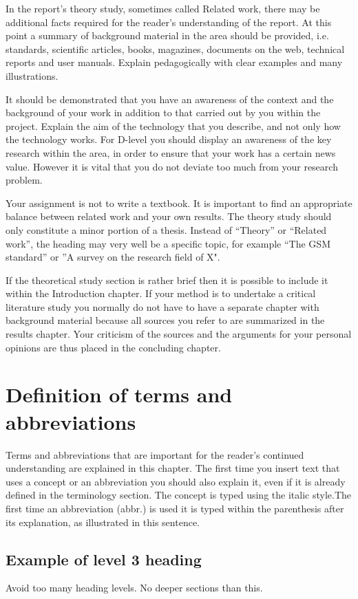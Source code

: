 In the report's theory study, sometimes called Related work, there may
be additional facts required for the reader's understanding of the report.
At this point a summary of background material in the area should be
provided, i.e. standards, scientific articles, books, magazines, documents
on the web, technical reports and user manuals. Explain pedagogically
with clear examples and many illustrations.

It should be demonstrated that you have an awareness of the context
and the background of your work in addition to that carried out by you
within the project. Explain the aim of the technology that you describe,
and not only how the technology works. For D-level you should display
an awareness of the key research within the area, in order to ensure that
your work has a certain news value. However it is vital that you do not
deviate too much from your research problem.

Your assignment is not to write a textbook. It is important to find an
appropriate balance between related work and your own results. The
theory study should only constitute a minor portion of a thesis.
Instead of “Theory” or “Related work”, the heading may very well be a
specific topic, for example “The GSM standard” or ”A survey on the
research field of X".

If the theoretical study section is rather brief then it is possible to include
it within the Introduction chapter.
If your method is to undertake a critical literature study you normally
do not have to have a separate chapter with background material
because all sources you refer to are summarized in the results chapter.
Your criticism of the sources and the arguments for your personal
opinions are thus placed in the concluding chapter. 

\section{Definition of terms and abbreviations}
Terms and abbreviations that are important for the reader's continued
understanding are explained in this chapter. The first time you insert
text that uses a concept or an abbreviation you should also explain it,
even if it is already defined in the terminology section. The concept is
typed using the italic style.The first time an abbreviation (abbr.) is used it is typed within the
parenthesis after its explanation, as illustrated in this sentence. 

\subsection{Example of level 3 heading}
Avoid too many heading levels. No deeper sections than this. 

